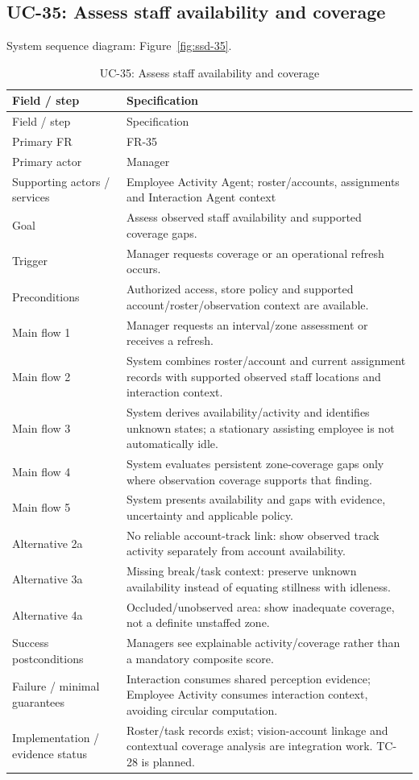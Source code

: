\subsection*{UC-35: Assess staff availability and coverage}
\label{uc:35}
System sequence diagram: Figure~\ref{fig:ssd-35}.

\begin{longtable}{P{0.23\textwidth}P{0.67\textwidth}}
\caption{UC-35: Assess staff availability and coverage}\\
\toprule
Field / step & Specification\\
\midrule
\endfirsthead
\toprule
Field / step & Specification\\
\midrule
\endhead
Primary FR & FR-35\\
Primary actor & Manager\\
Supporting actors / services & Employee Activity Agent; roster/accounts, assignments and Interaction Agent context\\
Goal & Assess observed staff availability and supported coverage gaps.\\
Trigger & Manager requests coverage or an operational refresh occurs.\\
Preconditions & Authorized access, store policy and supported account/roster/observation context are available.\\
Main flow 1 & Manager requests an interval/zone assessment or receives a refresh.\\
Main flow 2 & System combines roster/account and current assignment records with supported observed staff locations and interaction context.\\
Main flow 3 & System derives availability/activity and identifies unknown states; a stationary assisting employee is not automatically idle.\\
Main flow 4 & System evaluates persistent zone-coverage gaps only where observation coverage supports that finding.\\
Main flow 5 & System presents availability and gaps with evidence, uncertainty and applicable policy.\\
Alternative 2a & No reliable account-track link: show observed track activity separately from account availability.\\
Alternative 3a & Missing break/task context: preserve unknown availability instead of equating stillness with idleness.\\
Alternative 4a & Occluded/unobserved area: show inadequate coverage, not a definite unstaffed zone.\\
Success postconditions & Managers see explainable activity/coverage rather than a mandatory composite score.\\
Failure / minimal guarantees & Interaction consumes shared perception evidence; Employee Activity consumes interaction context, avoiding circular computation.\\
Implementation / evidence status & Roster/task records exist; vision-account linkage and contextual coverage analysis are integration work. TC-28 is planned.\\
\bottomrule
\end{longtable}

